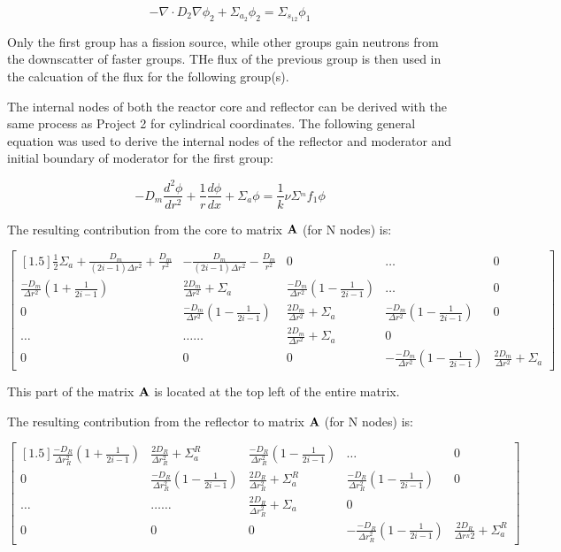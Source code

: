 \documentclass[../main.tex]{subfiles}
\begin{document}
	\begin{equation*}
		- \nabla \cdot D_{2} \nabla \phi_{2}+ \Sigma_{a_2} \phi_2 = \Sigma_{s_{12}} \phi_1
	\end{equation*}

Only the first group has a fission source, while other groups gain neutrons from the downscatter of faster groups.  THe flux of the previous group is then used in the calcuation of the flux for the following group(s).

The internal nodes of both the reactor core and reflector can be derived with the same process as Project 2 for cylindrical coordinates.  The following general equation was used to derive the internal nodes of the reflector and moderator  and initial boundary of moderator for the first group:

\begin{equation*}
		-D_m \frac{d^2 \phi}{d r^2} + \frac{1}{r} \frac{d \phi}{dx} + \Sigma_a \phi =   \frac{1}{k} \nu \Sigma^_mf_1 \phi
	\end{equation*}
	


The resulting contribution from the core to matrix $\mathbf{A}$ (for N nodes) is:

\[
	\begin{bmatrix}[1.5]
		\frac{1}{2} \Sigma_a + \frac{D_m}{(2i-1)\Delta r^2} +\frac{D_m}{r^2} & -\frac{D_m}{(2i-1)\Delta r^2} - \frac{D_m}{r^2} & 0 & \dots & 0 \\
		\frac{-D_m}{\Delta r^2} \left( 1 + \frac{1}{2i-1} \right) & \frac{2D_m}{\Delta r^2} + \Sigma_a &  \frac{-D_m}{\Delta r^2} \left( 1 - \frac{1}{2i-1} \right) & \dots & 0 \\
		0 &  \frac{-D_m}{\Delta r^2} \left( 1 - \frac{1}{2i-1} \right) & \frac{2D_m}{\Delta r^2} + \Sigma_a & \frac{-D_m}{\Delta r^2} \left( 1 - \frac{1}{2i-1} \right) & 0\\
		\dots & \dots \dots & \frac{2D_m}{\Delta r^2} + \Sigma_a & 0 \\
		0 & 0 & 0 & -\frac{-D_m}{\Delta r^2} \left( 1 - \frac{1}{2i-1} \right) & \frac{2D_m}{\Delta r^2} + \Sigma_a
	\end{bmatrix}
	\]
	
This part of the matrix $\mathbf{A}$ is located at the top left of the entire matrix.
	
The resulting contribution from the reflector to matrix $\mathbf{A}$ (for N nodes) is:

\[
	\begin{bmatrix}[1.5]
		\frac{-D_R}{\Delta r_R^2} \left( 1 + \frac{1}{2i-1} \right) & \frac{2D_R}{\Delta r_R^2} + \Sigma^R_a &  \frac{-D_R}{\Delta r_R^2} \left( 1 - \frac{1}{2i-1} \right) & \dots & 0 \\
		0 &  \frac{-D_R}{\Delta r_R^2} \left( 1 - \frac{1}{2i-1} \right) & \frac{2D_R}{\Delta r_R^2} + \Sigma^R_a & \frac{-D_R}{\Delta r_R^2} \left( 1 - \frac{1}{2i-1} \right) & 0\\
		\dots & \dots \dots & \frac{2D_R}{\Delta r_R^2} + \Sigma_a & 0 \\
		0 & 0 & 0 & -\frac{-D_R}{\Delta r_R^2} \left( 1 - \frac{1}{2i-1} \right) & \frac{2D_R}{\Delta r^_R2} + \Sigma^R_a
	\end{bmatrix}
	\]
\end{document}
